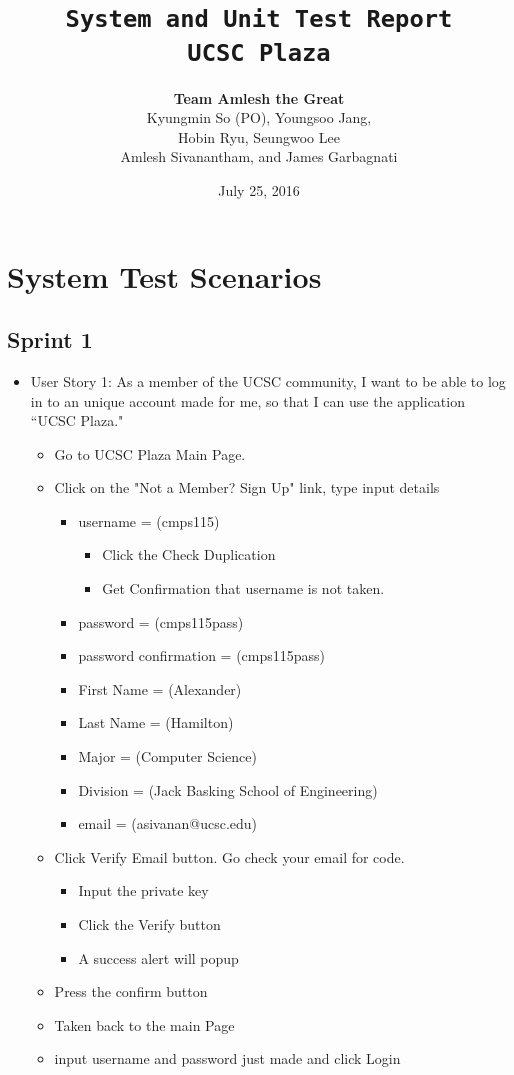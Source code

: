 \documentclass[10pt]{article}
\title{\color{primary}\texttt{System and Unit Test Report \\ UCSC Plaza}}
\author{{\color{secondary}\textbf{Team Amlesh the Great}} \\ Kyungmin So (PO), Youngsoo Jang, \\ Hobin Ryu, Seungwoo Lee \\ Amlesh Sivanantham, and James Garbagnati }
\date{July 25, 2016}
\newcommand{\fancysec}[2] {{\color{primary}\section{#1} \label{sec:#2}}}
\newcommand{\fancysub}[2] {{\color{primary}\subsection{#1} \label{sec:#2}}}
\begin{document}
\maketitle

\fancysec{System Test Scenarios}{systemTestScenarios}
	\fancysub{Sprint 1}{sprint1}
		\begin{itemize}
			\item User Story 1: As a member of the UCSC community, I want to be able to log in to an unique account made for me, so that I can use the application ``UCSC Plaza."
			
			\begin{itemize}
				\item Go to UCSC Plaza Main Page.
				\item Click on the "Not a Member? Sign Up" link, type input details
				\begin{itemize}
					\item username = (cmps115)
					\begin{itemize}
						\item Click the Check Duplication
						\item Get Confirmation that username is not taken.
					\end{itemize}
					\item password = (cmps115pass)
					\item password confirmation = (cmps115pass)
					\item First Name  = (Alexander)
					\item Last Name = (Hamilton)
					\item Major = (Computer Science)
					\item Division = (Jack Basking School of Engineering)
					\item email = (asivanan@ucsc.edu)
				\end{itemize}
				\item Click Verify Email button. Go check your email for code.
				\begin{itemize}
					\item Input the private key
					\item Click the Verify button
					\item A success alert will popup
				\end{itemize}
				\item Press the confirm button
				\item Taken back to the main Page
				\item input username and password just made and click Login
			\end{itemize}
			

\end{itemize}
\end{document}

